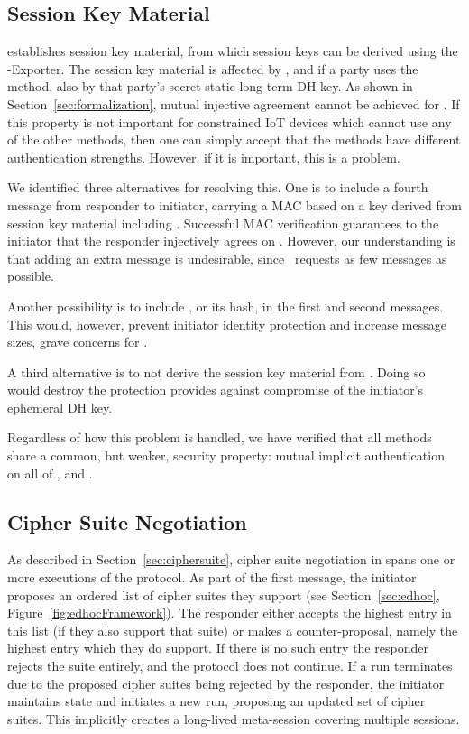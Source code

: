 \documentclass[runningheads, envcountsame, hidelinks, a4paper, x11names]{article}
\begin{document}
\subsection{Session Key Material}
\label{sec:sessionKeyMaterial}
\mEdhoc{} establishes session key material, from which session keys
can be derived using the \mEdhoc{}-Exporter.
%
The session key material is affected by \mGxy{}, and if a party uses the
\mStat{} method, also by that party's secret static long-term DH key.
%
As shown in Section~\ref{sec:formalization}, mutual injective agreement cannot
be achieved for \mGiy{}.
%
If this property is not important for constrained IoT devices which cannot use
any of the other methods, then one can simply accept that the methods have
different authentication strengths.
%
However, if it is important, this is a problem.
%

We identified three alternatives for resolving this.
%
One is to include a fourth message from responder to initiator,
carrying a MAC based on a key derived from session key
material including \mGiy{}.
%
Successful MAC verification guarantees
to the initiator that the responder injectively agrees on \mGiy{}.
%
However, our understanding is that adding an extra message is
undesirable, since~\cite{selander-lake-edhoc-01} requests as few messages as
possible.
%

Another possibility is to include \mGi{}, or its hash, in the first and
second messages.
%
This would, however, prevent initiator identity protection and increase message
sizes, grave concerns for \mEdhoc{}.
%

A third alternative is to not derive the session key material from \mGiy{}.
%
Doing so would destroy the protection \mOptls{} provides against compromise
of the initiator's ephemeral DH key.
%

Regardless of how this problem is handled, we have verified that all methods
share a common, but weaker, security property: mutual implicit authentication
on all of \mGxy{}, \mGiy{} and \mGrx{}.
%

\subsection{Cipher Suite Negotiation}
\label{sec:ciphersuiteNegotiation}
As described in Section~\ref{sec:ciphersuite}, cipher suite negotiation in \mEdhoc{} spans one or more executions of the
protocol.
%
As part of the first message, the initiator proposes an ordered list of cipher suites they support (see Section~\ref{sec:edhoc}, Figure~\ref{fig:edhocFramework}). The responder either accepts the highest entry in this list (if they also support that suite) or makes a counter-proposal, namely the highest entry which they do support. If there is no such entry the responder rejects the suite entirely, and the protocol does not continue. 
%
If a run terminates due to the proposed cipher suites being rejected by the
responder, the initiator maintains state and initiates a new run, proposing
an updated set of cipher suites.
%
This implicitly creates a long-lived
meta-session covering multiple \mEdhoc{} sessions.
%
\end{document}

